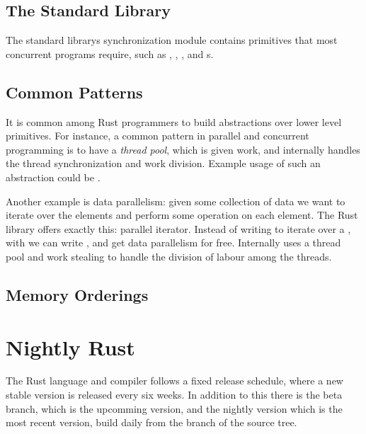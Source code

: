 \subsection{The Standard Library}

The standard librarys synchronization module  contains primitives that most
concurrent programs require, such as , , , and
s.

\subsection{Common Patterns}

It is common among Rust programmers to build abstractions over lower level primitives. For
instance, a common pattern in parallel and concurrent programming is to have a \emph{thread pool},
which is given work, and internally handles the thread synchronization and work division. Example
usage of such an abstraction could be .

Another example is data parallelism: given some collection of data we want to iterate over the
elements and perform some operation on each element. The Rust library  offers exactly
this: parallel iterator. Instead of writing  to iterate over a , with
 we can write , and get data parallelism for free. Internally
 uses a thread pool and work stealing to handle the division of labour among the
threads.


\subsection{Memory Orderings}

\section{Nightly Rust}

The Rust language and compiler follows a fixed release schedule, where a new stable version is
released every six weeks. In addition to this there is the beta branch, which is the upcomming
version, and the nightly version which is the most recent version, build daily from the
 branch of the source tree.

